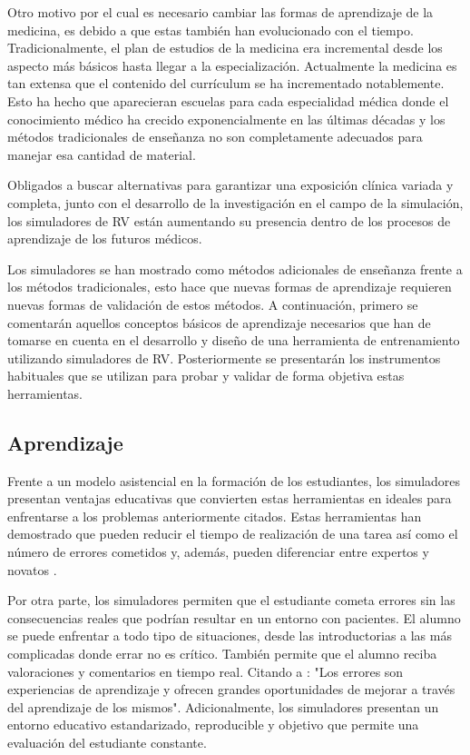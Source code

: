 Otro motivo por el cual es necesario cambiar las formas de aprendizaje de la medicina, es debido a que estas también han evolucionado con el tiempo.
Tradicionalmente, el plan de estudios de la medicina era incremental desde los aspecto más básicos hasta llegar a la especialización. Actualmente la medicina es tan extensa que el contenido del currículum se ha incrementado notablemente. Esto ha hecho que aparecieran escuelas para cada especialidad médica donde el conocimiento médico ha crecido exponencialmente en las últimas décadas y los métodos tradicionales de enseñanza no son completamente adecuados para manejar esa cantidad de material.

Obligados a buscar alternativas para garantizar una exposición clínica variada y completa, junto con el desarrollo de la investigación en el campo de la simulación, los simuladores de \ac{RV} están aumentando su presencia dentro de los procesos de aprendizaje de los futuros médicos.

 Los simuladores se han mostrado como métodos adicionales de enseñanza frente a los métodos tradicionales, esto hace que nuevas formas de aprendizaje requieren nuevas formas de validación de estos métodos. A continuación, primero se comentarán aquellos conceptos básicos de aprendizaje necesarios que han de tomarse en cuenta en el desarrollo y diseño de una herramienta de entrenamiento utilizando simuladores de \ac{RV}. Posteriormente se presentarán los instrumentos habituales que se utilizan para probar y validar de forma objetiva estas herramientas.


\subsection{Aprendizaje}

Frente a un modelo asistencial en la formación de los estudiantes, los simuladores presentan  ventajas educativas que convierten estas herramientas en ideales para enfrentarse a los problemas anteriormente citados. Estas herramientas han demostrado que pueden reducir el tiempo de realización de una tarea así como el número de errores cometidos y, además, pueden diferenciar entre expertos y novatos \cite{Gurusamy08}.

Por otra parte, los simuladores permiten que el estudiante cometa errores sin las consecuencias reales que podrían resultar en un entorno con pacientes. El alumno se puede enfrentar a todo tipo de situaciones, desde las introductorias a las más complicadas donde errar no es crítico. También permite que el alumno reciba valoraciones y comentarios en tiempo real. Citando a \cite{ziv2008educacion}: "Los errores son experiencias de aprendizaje y ofrecen grandes oportunidades de mejorar a través del aprendizaje de los mismos". Adicionalmente, los simuladores presentan un entorno educativo estandarizado, reproducible y objetivo que permite una evaluación del estudiante constante.


